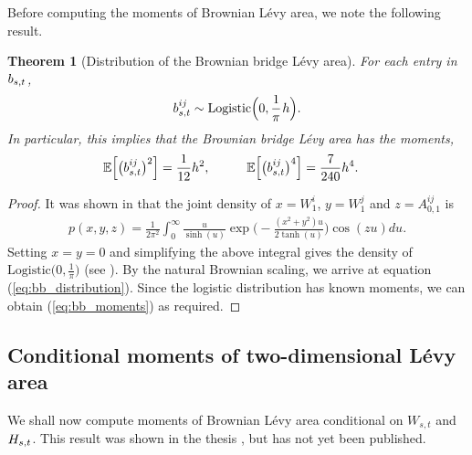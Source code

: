\documentclass[sn-mathphys-num]{sn-jnl}%
\newtheorem{theorem}{Theorem}%
\newcommand{\E}{\mathbb{E}}
\newcommand{\m}{\hspace{0.25mm}}
\newcommand{\mmm}{\hspace{10mm}}
\begin{document}
Before computing the moments of Brownian L\'{e}vy area, we note the following result. \medbreak
\begin{theorem}[Distribution of the Brownian bridge L\'{e}vy area]\label{thm:bb_distribution}
For each entry in $b_{s,t}\m$,
\begin{align}\label{eq:bb_distribution}
b_{s,t}^{ij} \sim \mathrm{Logistic}\Big(0, \frac{1}{\pi}\m h\Big).
\end{align}
In particular, this implies that the Brownian bridge L\'{e}vy area has the moments,
\begin{align}\label{eq:bb_moments}
\E\Big[\big(b_{s,t}^{ij}\big)^2\Big] & = \frac{1}{12}h^2,\mmm
\E\Big[\big(b_{s,t}^{ij}\big)^4\Big] = \frac{7}{240}h^4.
\end{align}
\end{theorem}
\begin{proof}
It was shown in \cite{levy1951area} that the joint density of $x = W_1^i$, $y = W_1^j$ and $z = A_{0,1}^{ij}$ is
\begin{align*}
p(x,y,z) = \frac{1}{2\pi^2}\int_0^\infty \frac{u}{\sinh(u)}\exp\Big(-\frac{(x^2 + y^2)u}{2\tanh(u)}\Big)\cos(z u) du.
\end{align*}
Setting $x = y = 0$ and simplifying the above integral gives the density of $\mathrm{Logistic}\big(0, \frac{1}{\pi}\big)$ (see \cite[Theorem 7.0.15]{foster2020thesis}). By the natural Brownian scaling, we arrive at equation (\ref{eq:bb_distribution}).
Since the logistic distribution has known moments, we can obtain (\ref{eq:bb_moments}) as required.
\end{proof}

\subsection{Conditional moments of two-dimensional L\'{e}vy area}\label{sect:moments1}

We shall now compute moments of Brownian L\'{e}vy area conditional on $W_{s,t}$ and $H_{s,t}\m$. This result was shown in the thesis \cite[Theorem 7.1.1]{foster2020thesis}, but has not yet been published.\medbreak
\end{document}
